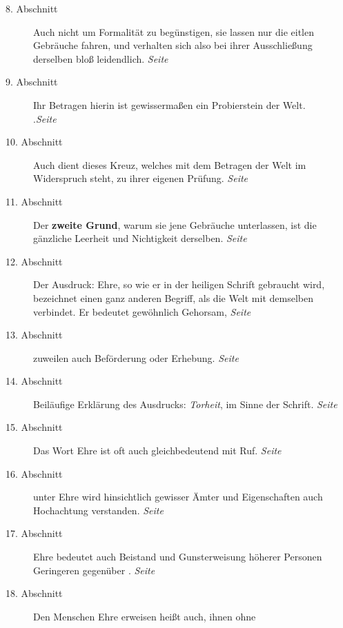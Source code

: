 \begin{description}
\item[8. Abschnitt] Auch nicht um Formalität zu begünstigen, sie lassen nur die
eitlen Gebräuche fahren, und verhalten sich also bei ihrer Ausschließung
derselben bloß leidendlich.
\dotfill \textit{Seite~\pageref{kap9_ab8}}\\
\item[9. Abschnitt] Ihr Betragen hierin ist gewissermaßen ein Probierstein der
Welt.\\
.\dotfill \textit{Seite~\pageref{kap9_ab9}}\\
\item[10. Abschnitt] Auch dient dieses Kreuz, welches mit dem Betragen der Welt
im Widerspruch steht, zu ihrer eigenen Prüfung.
\dotfill \textit{Seite~\pageref{kap9_ab10}}\\
\item[11. Abschnitt] Der \textbf{zweite Grund}, warum sie jene Gebräuche
unterlassen, ist
die gänzliche Leerheit und Nichtigkeit derselben.
\dotfill \textit{Seite~\pageref{kap9_ab11}}\\
\item[12. Abschnitt] Der Ausdruck: Ehre, so wie er in der heiligen Schrift
gebraucht wird, bezeichnet einen ganz anderen Begriff, als die Welt mit
demselben
verbindet. Er bedeutet gewöhnlich Gehorsam,
\dotfill \textit{Seite~\pageref{kap9_ab12}}\\
\item[13. Abschnitt] zuweilen auch Beförderung oder Erhebung.
\dotfill \textit{Seite~\pageref{kap9_ab13}}\\
\item[14. Abschnitt] Beiläufige Erklärung des Ausdrucks: \textit{Torheit}, im
Sinne
der Schrift.
\dotfill \textit{Seite~\pageref{kap9_ab14}}\\
\item[15. Abschnitt] Das Wort Ehre ist oft auch gleichbedeutend mit Ruf.
\dotfill \textit{Seite~\pageref{kap9_ab15}}\\
\item[16. Abschnitt] unter Ehre wird hinsichtlich gewisser Ämter und
Eigenschaften auch Hochachtung verstanden.
\dotfill \textit{Seite~\pageref{kap9_ab16}}\\
\item[17. Abschnitt] Ehre bedeutet auch Beistand und Gunsterweisung höherer
Personen Geringeren gegenüber
.
\dotfill \textit{Seite~\pageref{kap9_ab17}}\\
\item[18. Abschnitt] Den Menschen Ehre erweisen heißt auch, ihnen ohne

\end{description}
